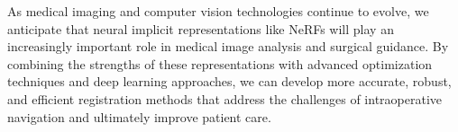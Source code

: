 As medical imaging and computer vision technologies continue to evolve, we anticipate that neural implicit representations like NeRFs will play an increasingly important role in medical image analysis and surgical guidance. By combining the strengths of these representations with advanced optimization techniques and deep learning approaches, we can develop more accurate, robust, and efficient registration methods that address the challenges of intraoperative navigation and ultimately improve patient care. 